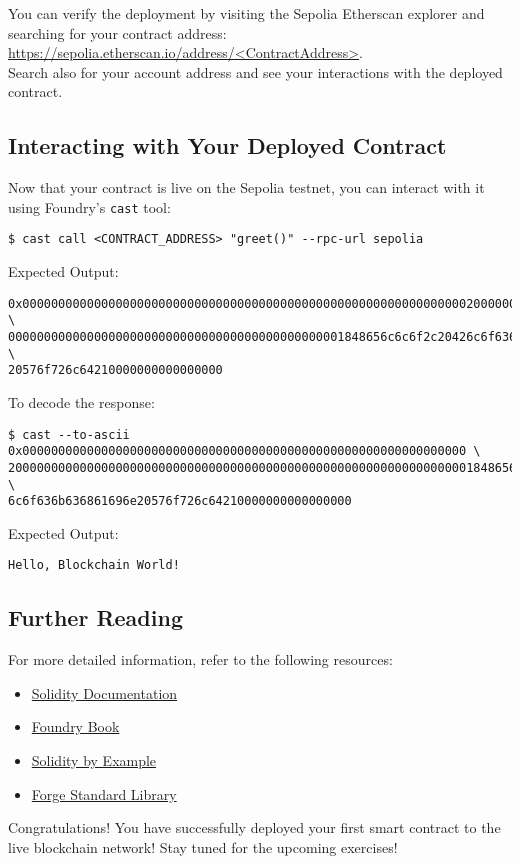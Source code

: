 \documentclass[12pt]{article}
\begin{document}
You can verify the deployment by visiting the Sepolia Etherscan explorer and searching for your contract address: \\ \url{https://sepolia.etherscan.io/address/<ContractAddress>}. \\ Search also for your account address and see your interactions with the deployed contract.

\subsection{Interacting with Your Deployed Contract}

Now that your contract is live on the Sepolia testnet, you can interact with it using Foundry's \texttt{cast} tool:

\begin{verbatim}
$ cast call <CONTRACT_ADDRESS> "greet()" --rpc-url sepolia
\end{verbatim}

Expected Output:
\begin{verbatim}
0x00000000000000000000000000000000000000000000000000000000000000200000000000000000 \
00000000000000000000000000000000000000000000001848656c6c6f2c20426c6f636b636861696e \
20576f726c64210000000000000000
\end{verbatim}

To decode the response:
\begin{verbatim}
$ cast --to-ascii 0x00000000000000000000000000000000000000000000000000000000000000 \
20000000000000000000000000000000000000000000000000000000000000001848656c6c6f2c2042 \
6c6f636b636861696e20576f726c64210000000000000000
\end{verbatim}

Expected Output:
\begin{verbatim}
Hello, Blockchain World!
\end{verbatim}

\subsection{Further Reading}

For more detailed information, refer to the following resources:

\begin{itemize}
    \item \href{https://docs.soliditylang.org/en/latest/}{Solidity Documentation}
    \item \href{https://book.getfoundry.sh/}{Foundry Book}
    \item \href{https://solidity-by-example.org/}{Solidity by Example}
    \item \href{https://github.com/foundry-rs/forge-std}{Forge Standard Library}
\end{itemize}
Congratulations! You have successfully deployed your first smart contract to the live blockchain network! Stay tuned for the upcoming exercises!
\end{document}
